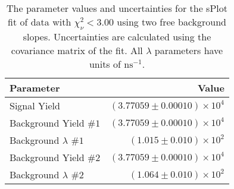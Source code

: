 
\begin{table}[ht]
    \begin{center}
        \begin{tabular}{lr}\toprule
            Parameter & Value \\\midrule
            Signal Yield & $(3.77059 \pm 0.00010) \times 10^{4}$ \\
            Background Yield $\#1$ & $(3.77059 \pm 0.00010) \times 10^{4}$ \\
            Background $\lambda$ $\#1$ & $(1.015 \pm 0.010) \times 10^{2}$ \\
            Background Yield $\#2$ & $(3.77059 \pm 0.00010) \times 10^{4}$ \\
            Background $\lambda$ $\#2$ & $(1.064 \pm 0.010) \times 10^{2}$ \\\bottomrule
        \end{tabular}
        \caption{The parameter values and uncertainties for the sPlot fit of data with $\chi^2_\nu < 3.00$ using two free background slopes. Uncertainties are calculated using the covariance matrix of the fit. All $\lambda$ parameters have units of $\si{\nano\second}^{-1}$.}\label{tab:splot-fit-results-chisqdof-3.00-free-2}
    \end{center}
\end{table}
